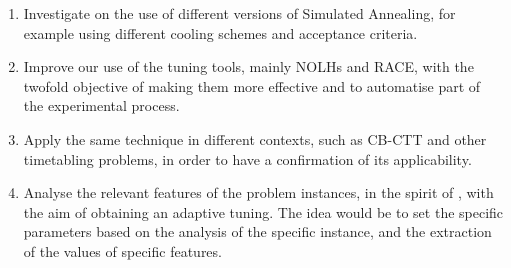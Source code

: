 \documentclass[authoryear,preprint,a4paper,12pt]{elsarticle}
\begin{document}
\begin{enumerate}
\item Investigate on the use of different versions of Simulated
  Annealing, for example using different cooling schemes and
  acceptance criteria.
\item Improve our use of the tuning tools, mainly NOLHs and RACE, with
  the twofold objective of making them more effective and to
  automatise part of the experimental process.
\item Apply the same technique in different contexts, such as CB-CTT
  and other timetabling problems, in order to have a confirmation of
  its applicability.
\item Analyse the relevant features of the problem instances, in the
  spirit of \cite{KoSo04,SMLo11}, with the aim of obtaining an adaptive
  tuning. The idea would be to set the specific parameters based on
  the analysis of the specific instance, and the extraction of the
  values of specific features.
\end{enumerate}



\end{document}

